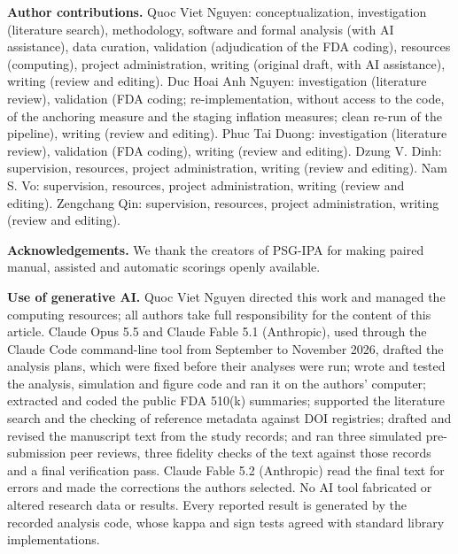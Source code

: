 \documentclass[11pt]{article}
\begin{document}
\smallskip\noindent\textbf{Author contributions.} Quoc Viet Nguyen: conceptualization, investigation (literature
search), methodology, software and formal analysis (with AI assistance), data curation, validation (adjudication of the FDA coding), resources (computing), project
administration, writing (original draft, with AI assistance), writing (review and editing). Duc Hoai Anh Nguyen: investigation (literature review), validation
(FDA coding; re-implementation, without access to the code, of the anchoring measure and the staging inflation
measures; clean re-run of the pipeline), writing (review and editing). Phuc Tai Duong:
investigation (literature review), validation (FDA coding), writing (review and editing). Dzung V. Dinh: supervision, resources, project administration, writing (review and editing). Nam S. Vo: supervision, resources, project administration, writing (review and editing).
Zengchang Qin: supervision, resources, project administration, writing (review and editing).

\smallskip\noindent\textbf{Acknowledgements.} We thank the creators of PSG-IPA for making paired manual, assisted and
automatic scorings openly available.

\smallskip\noindent\textbf{Use of generative AI.} Quoc Viet Nguyen directed this work and managed the computing
resources; all authors take full responsibility for the content of this article. Claude Opus 5.5 and Claude Fable 5.1 (Anthropic), used through the Claude Code command-line tool
from September to November 2026, drafted the analysis plans, which were fixed before their analyses were run; wrote
and tested the analysis, simulation and figure code and ran it on the authors' computer; extracted and coded the
public FDA 510(k) summaries; supported the literature search and the checking of reference metadata against DOI
registries; drafted and revised the manuscript text from the study records; and ran three simulated pre-submission
peer reviews, three fidelity checks of the text against those records and a final verification pass. Claude Fable 5.2 (Anthropic) read the final text for errors and made the corrections the authors selected. No AI tool
fabricated or altered research data or results. Every reported result is generated by the recorded analysis code,
whose kappa and sign tests agreed with standard library implementations.
\end{document}
